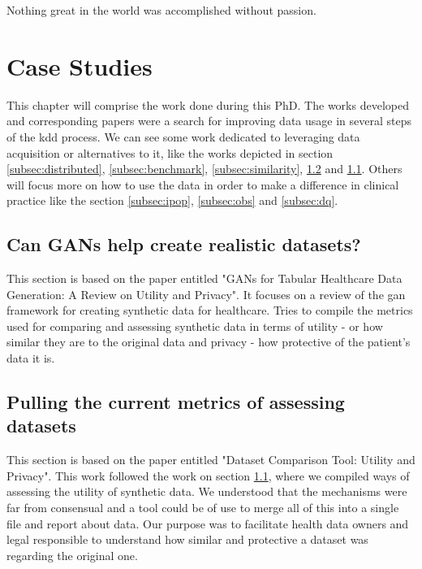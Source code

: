 \begin{savequote}[85mm]
Nothing great in the world was accomplished 
without passion.
\end{savequote}

\chapter{Case Studies}\label{chap:usecase}
This chapter will comprise the work done during this PhD. The works developed and corresponding papers were a search for improving data usage in several steps of the \ac{kdd} process. We can see some work dedicated to leveraging data acquisition or alternatives to it, like the works depicted in section \ref{subsec:distributed}, \ref{subsec:benchmark}, \ref{subsec:similarity}, \ref{subsec:tabular} and \ref{subsec:gans}. Others will focus more on how to use the data in order to make a difference in clinical practice like the section \ref{subsec:ipop}, \ref{subsec:obs} and \ref{subsec:dq}.



\section{Can GANs help create realistic datasets?}\label{subsec:gans}
This section is based on the paper entitled "GANs for Tabular Healthcare Data Generation: A Review on Utility and Privacy". It focuses on a review of the \ac{gan} framework for creating synthetic data for healthcare. Tries to compile the metrics used for comparing and assessing synthetic data in terms of utility - or how similar they are to the original data and privacy - how protective of the patient's data it is. 



\section{Pulling the current metrics of assessing datasets}\label{subsec:tabular}
This section is based on the paper entitled "Dataset Comparison Tool: Utility and Privacy". This work followed the work on section \ref{subsec:gans}, where we compiled ways of assessing the utility of synthetic data. We understood that the mechanisms were far from consensual and a tool could be of use to merge all of this into a single file and report about data. Our purpose was to facilitate health data owners and legal responsible to understand how similar and protective a dataset was regarding the original one.

